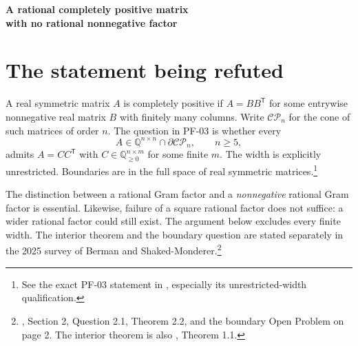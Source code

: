 \documentclass[11pt]{article}
\theoremstyle{definition}
\newcommand{\R}{\mathbb R}
\newcommand{\Q}{\mathbb Q}
\newcommand{\CP}{\mathcal{CP}}
\newcommand{\trans}{^{\mathsf T}}
\numberwithin{equation}{section}
\begin{document}
\begin{center}
{\LARGE\bfseries A rational completely positive matrix\\[0.2em]
with no rational nonnegative factor}
\end{center}

\begin{abstract}
An explicit integer matrix of order $444$ and rank seven is constructed that
is completely positive over the reals but has no nonnegative rational Gram
factor of any finite width. All its entries are strictly positive, and its real
cp-rank is seven. The construction gives a negative answer to the universal
boundary-factorization question PF-03. The obstruction is a rational
polyhedral cone in $\R^7$ on which a trace-zero quadratic form is nonnegative
and has exactly seven irrational zero rays forming an orthonormal basis.
The arithmetic seed lies in $\Q(\sqrt[3]{2})$. Rational interval calculations
certify its signs, and exhaustive integer computation certifies all $444$
facets of the cone. The complete matrix, a compact integer representation,
and a standard-library Python verifier accompany the proof. This is a
computer-assisted proof presented for independent review; it has not been
formalized in a proof assistant or independently reviewed.
\end{abstract}

\section{The statement being refuted}
A real symmetric matrix $A$ is completely positive if $A=BB\trans$ for some
entrywise nonnegative real matrix $B$ with finitely many columns. Write
$\CP_n$ for the cone of such matrices of order $n$. The question in PF-03 is
whether every
\begin{equation}\label{eq:question}
 A\in\Q^{n\times n}\cap\partial\CP_n,\qquad n\geq5,
\end{equation}
admits $A=CC\trans$ with $C\in\Q_{\geq0}^{n\times m}$ for some finite $m$.
The width is explicitly unrestricted. Boundaries are in the full space of
real symmetric matrices.\footnote{See the exact PF-03 statement in
\cite{repo}, especially its unrestricted-width qualification.}

The distinction between a rational Gram factor and a \emph{nonnegative}
rational Gram factor is essential. Likewise, failure of a square rational
factor does not suffice: a wider rational factor could still exist. The
argument below excludes every finite width. The interior theorem and the
boundary question are stated separately in the 2025 survey of Berman and
Shaked-Monderer.\footnote{\cite{bsm}, Section 2, Question 2.1, Theorem 2.2,
and the boundary Open Problem on page 2. The interior theorem is also
\cite{dsv}, Theorem 1.1.}
\end{document}
